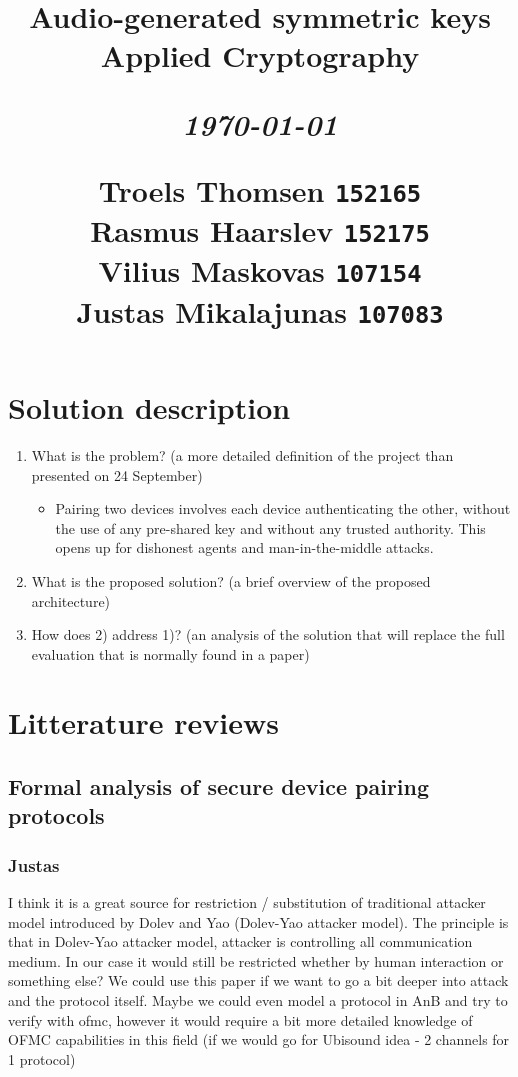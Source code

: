 \documentclass[12pt]{article}
\title{
  \vspace{4cm}
  \begin{flushleft}
  \Large{\textbf{Audio-generated symmetric keys}} \\
  \large{Applied Cryptography}
  \end{flushleft}
  \vspace{0cm}
  \begin{flushleft}
  \small
  \textit{\today}
  \end{flushleft}
  \vspace{12cm}
  \begin{flushleft}
  \small
  Troels Thomsen \texttt{152165} \\
  Rasmus Haarslev \texttt{152175} \\
  Vilius Maskovas \texttt{107154} \\
  Justas Mikalajunas \texttt{107083}\\
  \end{flushleft}
}
\date{
}
\begin{document}
\clearpage
{}
\thispagestyle{empty}
\maketitle

\newpage


\section{Solution description}
\label{sec:Solution description}

\begin{enumerate}
    \item What is the problem?  (a more detailed definition of the project than presented on 24 September)

    \begin{itemize}
        \item Pairing two devices involves each device authenticating the other, without the use of any pre-shared key and without any trusted authority. This opens up for dishonest agents and man-in-the-middle attacks. 
    \end{itemize}

    \item What is the proposed solution? (a brief overview of the proposed architecture)
    \item How does 2) address 1)?  (an analysis of the solution that will replace the full evaluation that is normally found in a paper)
\end{enumerate}

\newpage

\section{Litterature reviews}

\subsection{Formal analysis of secure device pairing protocols}
\label{sub:Formal analysis of secure device pairing protocols}

\subsubsection{Justas}
\label{subs:Justas}

I think it is a great source for restriction / substitution of traditional attacker model introduced by Dolev and Yao (Dolev-Yao attacker model).
The principle is that in Dolev-Yao attacker model, attacker is controlling all communication medium. In our case it would still be restricted whether by human interaction or something else?
We could use this paper if we want to go a bit deeper into attack and the protocol itself. Maybe we could even model a protocol in AnB and  try to verify with ofmc, however it would require a bit more detailed knowledge of OFMC capabilities in this field (if we would go for Ubisound idea - 2 channels for 1 protocol)
\end{document}
